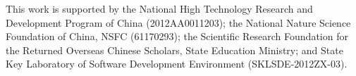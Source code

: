 \documentclass[10pt,conference,compsocconf]{IEEEtran}
\begin{document}
This work is supported by the National High Technology Research and Development Program of China (2012AA0011203); the National Nature Science Foundation of China, NSFC (61170293); the Scientific Research Foundation for the Returned Overseas Chinese Scholars, State Education Ministry; and State Key Laboratory of Software Development Environment (SKLSDE-2012ZX-03).





%
\end{document}
